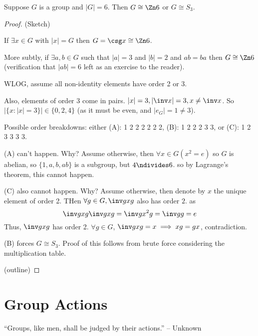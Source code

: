 \documentclass[notes.tex]{subfiles}
\begin{document}
\begin{proposition}
	Suppose $G$ is a group and $|G| = 6$. Then $G\cong\Zn6$ or $G\cong S_3$. 
\end{proposition}

\begin{proof}
	(Sketch)

	If $\exists x\in G$ with $|x|=G$ then $G = \csg x \cong \Zn6$.

	More subtly, if $\exists a, b\in G$  such that $|a| = 3$ and $|b| = 2$ and $ab = ba$ then $G\cong \Zn6$ (verification that $|ab| = 6$ left as an exercise to the reader).

	WLOG, assume all non-identity elements have order 2 or 3.

	Also, elements of order 3 come in pairs. $|x| = 3, |\inv x| = 3, x\ne\inv x$. So $|\{x : |x| = 3\}| \in \{0, 2, 4\}$ (as it must be even, and $|e_G| = 1 \ne 3$).

	Possible order breakdowns:
	either (A): 1 2 2 2 2 2 2, (B): 1 2 2 2 3 3, or (C): 1 2 3 3 3 3.

	\begin{claim}[1]
		(A) can't happen. Why? Assume otherwise, then $\forall x\in G (x^2 =e)$
		so $G$ is abelian, so $\{1, a, b, ab\}$ is a subgroup, but $4\ndivides 6$. so by Lagrange's theorem, this cannot happen. 
	\end{claim}
	
	\begin{claim}[2]
		(C) also cannot happen. Why?
		Assume otherwise, then denote by $x$ the unique element of order 2.
		THen $\forall g\in G, \inv gxg$ also has order $2$. 
		as \[
			\inv gxg\inv gxg = \inv gx^2g = \inv gg = e
		\]
		Thus, $\inv gxg$ has order 2. $\forall g\in G$, $\inv gxg = x \implies xg =gx$, contradiction.
	\end{claim}	

	\begin{claim}[3]
		(B) forces $G\cong S_3$. Proof of this follows from brute force considering the multiplication table.
	\end{claim}
	\qedhere(outline)
\end{proof}

\chapter*{Group Actions}
\begin{center}
	``Groups, like men, shall be judged by their actions.'' -- Unknown
\end{center}
\end{document}
